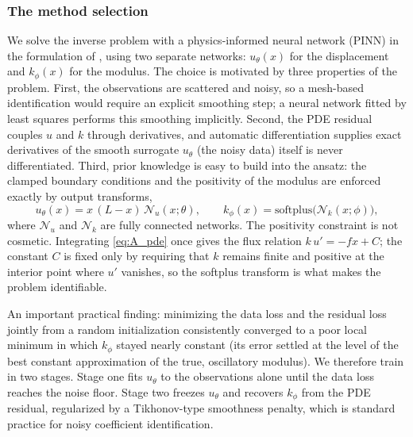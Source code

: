 \subsubsection{The method selection}
We solve the inverse problem with a physics-informed neural network (PINN)
in the formulation of \cite{raissi2019pinn}, using two separate networks:
$u_\theta(x)$ for the displacement and $k_\phi(x)$ for the modulus. The
choice is motivated by three properties of the problem. First, the
observations are scattered and noisy, so a mesh-based identification would
require an explicit smoothing step; a neural network fitted by least
squares performs this smoothing implicitly. Second, the PDE residual
couples $u$ and $k$ through derivatives, and automatic differentiation
supplies exact derivatives of the smooth surrogate $u_\theta$ (the noisy
data) itself is never differentiated. Third, prior knowledge is easy to
build into the ansatz: the clamped boundary conditions and the positivity
of the modulus are enforced exactly by output transforms,
\begin{equation}
    u_\theta(x) = x\,(L-x)\,\mathcal{N}_u(x;\theta), \qquad
    k_\phi(x) = \mathrm{softplus}\big(\mathcal{N}_k(x;\phi)\big),
\end{equation}
where $\mathcal{N}_u$ and $\mathcal{N}_k$ are fully connected networks. The
positivity constraint is not cosmetic. Integrating \eqref{eq:A_pde} once
gives the flux relation $k\,u' = -f x + C$; the constant $C$ is fixed only
by requiring that $k$ remains finite and positive at the interior point
where $u'$ vanishes, so the softplus transform is what makes the problem
identifiable.

An important practical finding: minimizing the data loss and the residual
loss jointly from a random initialization consistently converged to a poor
local minimum in which $k_\phi$ stayed nearly constant (its error settled
at the level of the best constant approximation of the true, oscillatory
modulus). We therefore train in two stages. Stage one fits $u_\theta$ to
the observations alone until the data loss reaches the noise floor. Stage
two freezes $u_\theta$ and recovers $k_\phi$ from the PDE residual,
regularized by a Tikhonov-type smoothness penalty, which is standard
practice for noisy coefficient identification.
%
